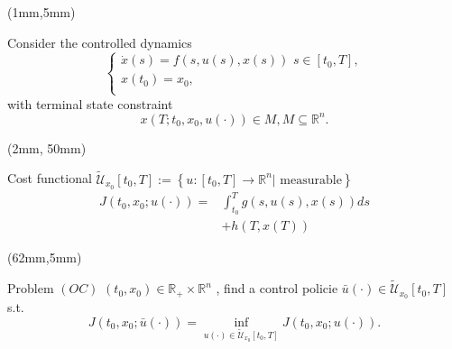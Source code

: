 \begin{frame}
    \begin{textblock*}{60mm}(1mm,5mm)
        \begin{greenbox}{Consider the controlled dynamics}
            $$\left\{ \begin{array}{l}
                \dot{x}(s)=f(s,u(s),x(s))\,\,s\in [t_0,T], \\
            x(t_0)=x_0,\\
            \end{array}
        \right.$$
        \tcblower
        with terminal state constraint
        $$x(T;t_0,x_0,u(\cdot))\in M, M\subseteq \mathbb{R}^n.$$
        \end{greenbox}
    \end{textblock*}
    \begin{textblock*}{65mm}(2mm, 50mm)
        \begin{yellowbox}{Cost functional}
           \hspace{-3mm}
           ${
               \tilde{\mathcal{U}}_{x_0}[t_0,T]
               :=
               \left\{%
                   u:[t_0, T]\to \mathbb{R}^n
                   | \text{ measurable}
               \right\}
           }
           $%
           \begin{align*}
                J(t_0,x_0;u(\cdot))
                   =&
                    \int_{t_0}^{T}
                       g(s, u(s), x(s)) ds
                   \\
                       &+ h(T, x(T))
           \end{align*}
        \end{yellowbox}
    \end{textblock*}
    \begin{textblock*}{65mm}(62mm,5mm)
        \begin{graybox}{Problem $(OC)$}
            $
            {
                (t_0,x_0)
                \in \mathbb{R}_{+}\times \mathbb{R}^n
            }
            $ , 
            find a control policie
            $
                {
                \bar{u}(\cdot)\in 
                \tilde{\mathcal{U}}_{x_0}[t_0,T]
                }
            $ 
            s.t.
            \begin{equation*}
                J(t_0, x_0; \bar{u}(\cdot))=
                    \inf_{u(\cdot)  \in 
                \tilde{\mathcal{U}}_{x_0}[t_0,T]} 
                J(t_0,x_0;u(\cdot)).
            \end{equation*}
        \end{graybox}
\end{textblock*}
\end{frame}

